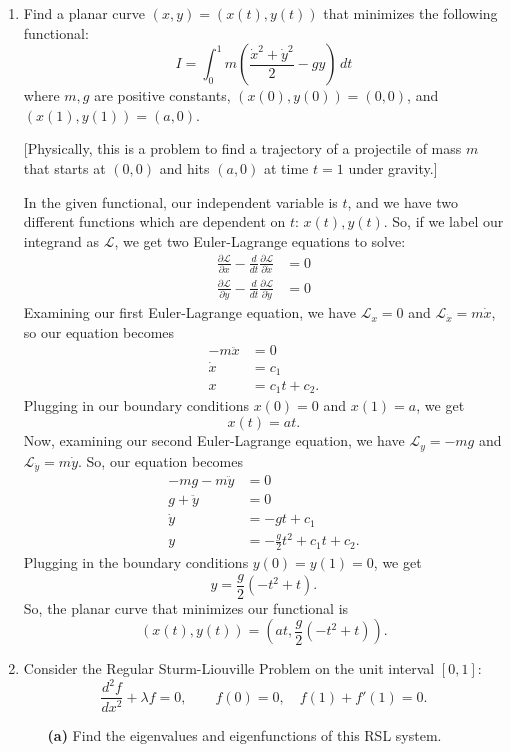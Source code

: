 \documentclass[10pt,letterpaper]{report}
\newcommand{\pp}[2]{\frac{\partial{#1}}{\partial{#2}}}
\begin{document}
\begin{enumerate}
\item
\begin{qbox}
Find a planar curve $(x, y) = (x(t), y(t))$ that minimizes the following functional:
\[
I = \int_0^1 m\left(\frac{\dot x^2 + \dot y^2}{2} - gy\right)\,dt
\]
where $m, g$ are positive constants, $(x(0), y(0)) = (0, 0)$, and $(x(1), y(1)) = (a, 0)$.

[Physically, this is a problem to find a trajectory of a projectile of mass $m$ that starts at $(0, 0)$ and hits $(a, 0)$ at time $t = 1$ under gravity.]
\end{qbox}

In the given functional, our independent variable is $t$, and we have two different functions which are dependent on $t$: $x(t), y(t)$. So, if we label our integrand as $\mathcal L$, we get two Euler-Lagrange equations to solve:
\begin{align*}
    \frac{\partial \mathcal L}{\partial x} - \frac{d}{dt}\pp{\mathcal L}{\dot x} &= 0
    \\
    \frac{\partial \mathcal L}{\partial y} - \frac{d}{dt}\pp{\mathcal L}{\dot y} &= 0
\end{align*}
Examining our first Euler-Lagrange equation, we have $\mathcal L_x = 0$ and $\mathcal L_{\dot x} = m\dot x$, so our equation becomes
\begin{align*}
    -m\ddot x &= 0 \\
    \dot x &= c_1 \\
    x &= c_1 t + c_2.
\end{align*}
Plugging in our boundary conditions $x(0) = 0$ and $x(1) = a$, we get
\[
x(t) = at.
\]
Now, examining our second Euler-Lagrange equation, we have $\mathcal L_y = -mg$ and $\mathcal L_{\dot y} = m\dot y$. So, our equation becomes
\begin{align*}
    -mg - m \ddot y &= 0 \\
    g + \ddot y &= 0 \\
    \dot y &= -gt + c_1 \\
    y &= -\frac{g}{2}t^2 + c_1t + c_2.
\end{align*}
Plugging in the boundary conditions $y(0) = y(1) = 0$, we get
\[
y = \frac{g}{2}\left(-t^2 + t\right).
\]
So, the planar curve that minimizes our functional is
\[
(x(t),y(t)) = \left(at, \frac{g}{2}\left(-t^2 + t\right)\right).
\]

\item
\begin{qbox}
Consider the Regular Sturm-Liouville Problem on the unit interval $[0, 1]$:
\[
\frac{d^2 f}{dx^2} + \lambda f = 0, \qquad f(0) = 0, \quad f(1) + f'(1) = 0.
\]
\begin{itemize}
    \item[\textbf{(a)}] Find the eigenvalues and eigenfunctions of this RSL system.
    

\end{itemize}
\end{qbox}
\end{enumerate}
\end{document}
